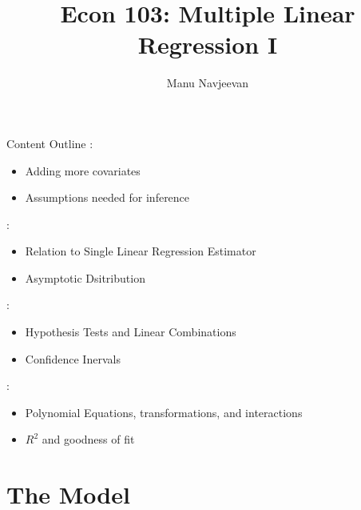 \documentclass[notheorems,9pt]{beamer}
\title{Econ 103: Multiple Linear Regression I}
\author{Manu Navjeevan}
\institute{UCLA}
\begin{document}
\frame{\titlepage}

\begin{frame}{Content Outline} 
	\label{frame:content-outline}
	:
	\begin{itemize}
		\item Adding more covariates
		\item Assumptions needed for inference
	\end{itemize}
	:
	\begin{itemize}
		\item Relation to Single Linear Regression Estimator
		\item Asymptotic Dsitribution
	\end{itemize}
	:
	\begin{itemize}
		\item Hypothesis Tests and Linear Combinations
		\item Confidence Inervals
	\end{itemize}
	:
	\begin{itemize}
		\item Polynomial Equations, transformations, and interactions
		\item \(R^2\) and goodness of fit
	\end{itemize}
\end{frame}
\section{The Model}
\end{document}
